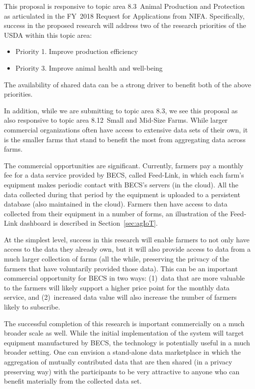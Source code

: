 This proposal is responsive to topic area 8.3~Animal Production and Protection
as articulated in the FY~2018 Request for Applications from NIFA.
Specifically, success in the proposed research will address two of the research
priorities of the USDA within this topic area:
\begin{itemize}
\item Priority 1. Improve production efficiency
\item Priority 3. Improve animal health and well-being
\end{itemize}
The availability of shared data can be a strong driver to benefit both of
the above priorities.

In addition, while we are submitting to topic area 8.3,
we see this proposal as also responsive to topic area 8.12~Small and
Mid-Size Farms.  While larger commercial organizations often have access
to extensive data sets of their own, it is the smaller farms that stand to
benefit the most from aggregating data across farms.

The commercial opportunities are significant.
Currently, farmers pay a monthly fee for a data service provided by
BECS, called Feed-Link, in which each farm's equipment makes periodic
contact with BECS's servers (in the cloud). All the data collected during
that period by the equipment is uploaded to a persistent database (also
maintained in the cloud). Farmers then have access to data collected from
their equipment in a number of forms, an illustration of the Feed-Link
dashboard is described in Section~\ref{sec:agIoT}.

At the simplest level, success in this research will enable farmers to
not only have access to the data they already own, but it will also provide
access to data from a much larger collection of farms (all the while,
preserving the privacy of the farmers that have voluntarily provided
those data). This can be an important commercial opportunity for BECS
in two ways: (1)~data that are more valuable to the farmers will likely
support a higher price point for the monthly data service, and (2)~increased
data value will also increase the number of farmers likely to subscribe.

The successful completion of this research is important commercially on
a much broader scale as well.  While the initial implementation of the
system will target equipment manufactured by BECS, the technology is
potentially useful in a much broader setting.  One can envision a
stand-alone data marketplace in which the aggregation of mutually
contributed data that are then shared (in a privacy preserving way)
with the participants to be very attractive to anyone who can benefit
materially from the collected data set.
